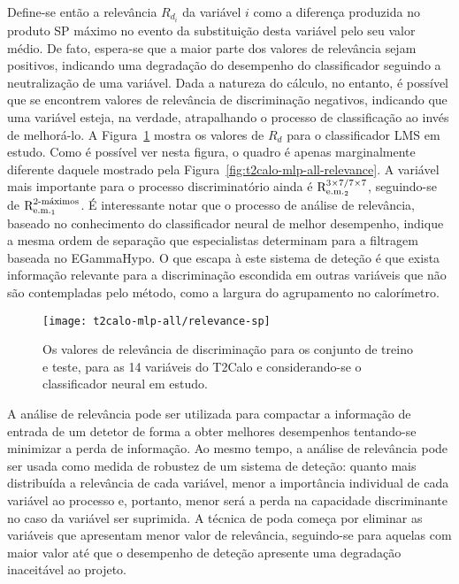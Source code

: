 Define-se então a relevância $R_{d_i}$ da variável $i$ como a diferença
produzida no produto SP máximo no evento da substituição desta variável pelo
seu valor médio. De fato, espera-se que a maior parte dos valores de
relevância sejam positivos, indicando uma degradação do desempenho do
classificador seguindo a neutralização de uma variável. Dada a natureza do
cálculo, no entanto, é possível que se encontrem valores de relevância de
discriminação negativos, indicando que uma variável esteja, na verdade,
atrapalhando o processo de classificação ao invés de melhorá-lo. A
Figura~\ref{fig:t2calo-mlp-all-relevance-disc} mostra os valores de $R_d$ para
o classificador LMS em estudo. Como é possível ver nesta figura, o quadro é
apenas marginalmente diferente daquele mostrado pela
Figura~\ref{fig:t2calo-mlp-all-relevance}. A variável mais importante para o
processo discriminatório ainda é $\rcore$, seguindo-se de $\eratio$. É
interessante notar que o processo de análise de relevância, baseado no
conhecimento do classificador neural de melhor desempenho, indique a mesma
ordem de separação que especialistas determinam para a filtragem baseada no
EGammaHypo. O que escapa à este sistema de deteção é que exista informação
relevante para a discriminação escondida em outras variáveis que não são
contempladas pelo método, como a largura do agrupamento no calorímetro.

\begin{figure}
\begin{center}
\texttt{[image: t2calo-mlp-all/relevance-sp]}
\end{center}
\caption{Os valores de relevância de discriminação para os conjunto de treino e
teste, para as 14 variáveis do T2Calo e considerando-se o classificador neural
em estudo.}
\label{fig:t2calo-mlp-all-relevance-disc}
\end{figure}

A análise de relevância pode ser utilizada para compactar a informação de
entrada de um detetor de forma a obter melhores desempenhos tentando-se
minimizar a perda de informação. Ao mesmo tempo, a análise de relevância pode
ser usada como medida de robustez de um sistema de deteção: quanto mais
distribuída a relevância de cada variável, menor a importância individual de
cada variável ao processo e, portanto, menor será a perda na capacidade
discriminante no caso da variável ser suprimida. A técnica de poda começa por
eliminar as variáveis que apresentam menor valor de relevância, seguindo-se
para aquelas com maior valor até que o desempenho de deteção apresente uma
degradação inaceitável ao projeto.

